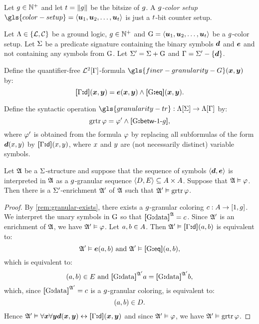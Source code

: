 \begin{definition}
Let $g \in \mathbb{N}^{+}$ and let $t = \|g\|$ be the bitsize of $g$.
A \emph{$g$-color setup}
${\gls{color-setup} = \seq{\suu1,\suu2,\dots,\suu\tbit}}$ is just a $t$-bit
counter setup.
\end{definition}

Let $\Lambda \in \left\{\mathcal{L}, \mathcal{C}\right\}$ be a ground logic,
$g \in \mathbb{N}^{+}$ and
$\mathrm{G} = \left\langle \bm{u}_{1},\bm{u}_{2},\dots,\bm{u}_{t} \right\rangle$ be a $g$-color setup.
Let $\mathrm{\Sigma}$ be a predicate signature containing the binary symbols
$\bm{d}$ and $\bm{e}$ and not containing any symbols from $\mathrm{G}$.
Let $\mathrm{\Sigma'} = \mathrm{\Sigma} + \mathrm{G}$ and $\mathrm{\Gamma} = \mathrm{\Sigma'} - \left\{\bm{d}\right\}$.

\begin{definition}
Define the quantifier-free $\mathcal{L}^{2}[\mathrm{\Gamma}]$-formula
$\gls{finer-granularity-G}(\xx,\yy)$ by:
\[
  {\bm{[}\mathrm{\Gamma}\mathord{\bm{:}}\mathsf{d}\bm{]}}(\bm{x},\bm{y}) = \bm{e}(\bm{x},\bm{y}) \land {\bm{[}\mathrm{G}\mathord{\bm{:}}\mathsf{eq}\bm{]}}(\bm{x},\bm{y}).
\]
\end{definition}
\begin{definition}
Define the syntactic operation $\gls{granularity-tr} : \aLF\SigS \to
\aLF\SigG$ by:
\[
  \operatorname{grtr}\varphi = {\varphi'} \land {\bm{[}\mathrm{G}\mathord{\bm{:}}\mathsf{betw}{\hbox{-}}1{\hbox{-}}g\bm{]}},
\]
where ${\varphi'}$ is obtained from the formula $\varphi$ by replacing all subformulas
of the form $\bm{d}(x,y)$ by ${\bm{[}\mathrm{\Gamma}\mathord{\bm{:}}\mathsf{d}\bm{]}}(x,y)$, where $x$ and $y$ are (not
necessarily distinct) variable symbols.
\end{definition}

\begin{lemma}\label{lem:granular-f-to-tr}
Let $\mathfrak{A}$ be a $\mathrm{\Sigma}$-structure and suppose that the sequence of
symbols $\left\langle \bm{d},\bm{e} \right\rangle$ is interpreted in $\mathfrak{A}$ as a
$g$-granular sequence $\left\langle D,E \right\rangle \subseteq {A\times A}$.
Suppose that $\mathfrak{A} \vDash \varphi$.
Then there is a $\mathrm{\Sigma'}$-enrichment $\mathfrak{A'}$ of $\mathfrak{A}$ such that
$\mathfrak{A'} \vDash \operatorname{grtr}\varphi$.
\end{lemma}
\begin{proof}
By \cref{rem:granular-exists}, there exists a $g$-granular coloring 
$c : A \to [1,g]$.
We interpret the unary symbols in $\mathrm{G}$ so that ${\bm{[}\mathrm{G}\mathord{\bm{:}}\mathrm{data}\bm{]}}^{\mathfrak{A}} = c$.
Since $\mathfrak{A'}$ is an enrichment of $\mathfrak{A}$, we have $\mathfrak{A'} \vDash \varphi$.
Let $a, b \in A$.
Then $\mathfrak{A'} \vDash {\bm{[}\mathrm{\Gamma}\mathord{\bm{:}}\mathsf{d}\bm{]}}(a,b)$ is equivalent to:
\[
  \mathfrak{A'} \vDash \bm{e}(a,b) \text{ and } \mathfrak{A'} \vDash {\bm{[}\mathrm{G}\mathord{\bm{:}}\mathsf{eq}\bm{]}}(a,b),
\]
which is equivalent to:
\[
  (a,b) \in E \text{ and } {\bm{[}\mathrm{G}\mathord{\bm{:}}\mathrm{data}\bm{]}}^{\mathfrak{A'}}a = {\bm{[}\mathrm{G}\mathord{\bm{:}}\mathrm{data}\bm{]}}^{\mathfrak{A'}}b,
\]
which, since ${\bm{[}\mathrm{G}\mathord{\bm{:}}\mathrm{data}\bm{]}}^{\mathfrak{A'}} = c$ is a $g$-granular coloring, is
equivalent to:
\[
  (a,b) \in D.
\]
Hence $\mathfrak{A'} \vDash \forall\bm{x}\forall\bm{y} \bm{d}(\bm{x},\bm{y}) \leftrightarrow {\bm{[}\mathrm{\Gamma}\mathord{\bm{:}}\mathsf{d}\bm{]}}(\bm{x},\bm{y})$
and since $\mathfrak{A'} \vDash \varphi$, we have $\mathfrak{A'} \vDash \operatorname{grtr}\varphi$.
\end{proof}

